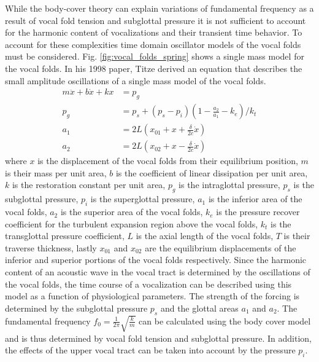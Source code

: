 \documentclass[12pt, letter]{report}
\begin{document}
While the body-cover theory can explain variations of fundamental frequency as a result of vocal fold tension and subglottal pressure it is not sufficient to account for the harmonic content of vocalizations and their transient time behavior. To account for these complexities time domain oscillator models of the vocal folds must be considered. Fig. \ref{fig:vocal_folds_spring} shows a single mass model for the vocal folds. In his 1998 paper, Titze derived an equation that describes the small amplitude oscillations of a single mass model of the vocal folds.
\begin{equation} 
\begin{split}
m \ddot{x} + b \dot{x} + k x &= p_g \\
p_g &= p_s + (p_s - p_i) \left( 1 - \frac{a_2}{a_1} - k_e \right) / k_t \\
a_1 &= 2 L (x_{01} + x + \frac{\delta}{2c} \dot{x}) \\
a_2 &= 2 L (x_{02} + x - \frac{\delta}{2c} \dot{x})
\end{split}
\end{equation}
where $x$ is the displacement of the vocal folds from their equilibrium position, $m$ is their mass per unit area, $b$ is the coefficient of linear dissipation per unit area, $k$ is the restoration constant per unit area, $p_g$ is the intraglottal pressure, $p_s$ is the subglottal pressure, $p_i$ is the superglottal pressure, $a_1$ is the inferior area of the vocal folds, $a_2$ is the superior area of the vocal folds, $k_e$ is the pressure recover coefficient for the turbulent expansion region above the vocal folds, $k_t$ is the transglottal pressure coefficient, $L$ is the axial length of the vocal folds, $T$ is their traverse thickness, lastly $x_{01}$ and $x_{02}$ are the equilibrium displacements of the inferior and superior portions of the vocal folds respectively. Since the harmonic content of an acoustic wave in the vocal tract is determined by the oscillations of the vocal folds, the time course of a vocalization can be described using this model as a function of physiological parameters. The strength of the forcing is determined by the subglottal pressure $p_s$ and the glottal areas $a_1$ and $a_2$. The fundamental frequency $f_0 = \frac{1}{2 \pi} \sqrt{\frac{k}{m}}$ can be calculated using the body cover model and is thus determined by vocal fold tension and subglottal pressure. In addition, the effects of the upper vocal tract can be taken into account by the pressure $p_i$.    
\end{document}
